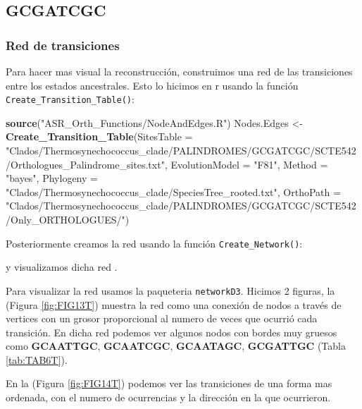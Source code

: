 \documentclass[
]{book}
\newenvironment{Shaded}{\begin{snugshade}}{\end{snugshade}}
\newcommand{\AttributeTok}[1]{\textcolor[rgb]{0.13,0.29,0.53}{#1}}
\newcommand{\FunctionTok}[1]{\textcolor[rgb]{0.13,0.29,0.53}{\textbf{#1}}}
\newcommand{\NormalTok}[1]{#1}
\newcommand{\OtherTok}[1]{\textcolor[rgb]{0.56,0.35,0.01}{#1}}
\newcommand{\StringTok}[1]{\textcolor[rgb]{0.31,0.60,0.02}{#1}}
\begin{document}
\hypertarget{gcgatcgc-4}{%
\subsection{GCGATCGC}\label{gcgatcgc-4}}

\hypertarget{red-de-transiciones-5}{%
\subsubsection{Red de transiciones}\label{red-de-transiciones-5}}

Para hacer mas visual la reconstrucción, construimos una red de las transiciones entre los estados ancestrales. Esto lo hicimos en r usando la función \texttt{Create\_Transition\_Table()}:

\begin{Shaded}
\begin{Highlighting}[]
\FunctionTok{source}\NormalTok{(}\StringTok{"ASR\_Orth\_Functions/NodeAndEdges.R"}\NormalTok{)}
\NormalTok{Nodes.Edges }\OtherTok{\textless{}{-}} \FunctionTok{Create\_Transition\_Table}\NormalTok{(}\AttributeTok{SitesTable =} \StringTok{"Clados/Thermosynechococcus\_clade/PALINDROMES/GCGATCGC/SCTE542/Orthologues\_Palindrome\_sites.txt"}\NormalTok{,}
                                \AttributeTok{EvolutionModel =} \StringTok{"F81"}\NormalTok{,}
                                \AttributeTok{Method =} \StringTok{"bayes"}\NormalTok{,}
                                \AttributeTok{Phylogeny =} \StringTok{"Clados/Thermosynechococcus\_clade/SpeciesTree\_rooted.txt"}\NormalTok{,}
                                \AttributeTok{OrthoPath =} \StringTok{"Clados/Thermosynechococcus\_clade/PALINDROMES/GCGATCGC/SCTE542/Only\_ORTHOLOGUES/"}\NormalTok{)}
\end{Highlighting}
\end{Shaded}

Posteriormente creamos la red usando la función \texttt{Create\_Network()}:

y visualizamos dicha red .

Para visualizar la red usamos la paqueteria \texttt{networkD3}. Hicimos 2 figuras, la (Figura \ref{fig:FIG13T}) muestra la red como una conexión de nodos a través de vertices con un grosor proporcional al numero de veces que ocurrió cada transición. En dicha red podemos ver algunos nodos con bordes muy gruesos como \textbf{GCAATTGC}, \textbf{GCAATCGC}, \textbf{GCAATAGC}, \textbf{GCGATTGC} (Tabla \ref{tab:TAB6T}).

En la (Figura \ref{fig:FIG14T}) podemos ver las transiciones de una forma mas ordenada, con el numero de ocurrencias y la dirección en la que ocurrieron.
\end{document}
